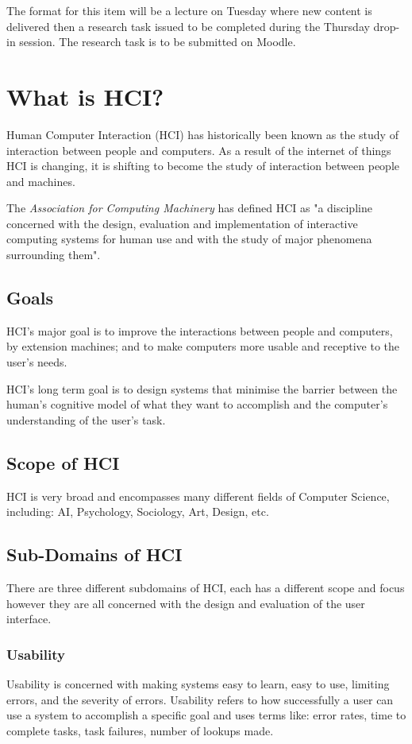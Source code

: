 
The format for this item will be a lecture on Tuesday where new content is delivered then a research task issued to be completed during the Thursday drop-in session. The research task is to be submitted on Moodle.

\section*{What is HCI?}
Human Computer Interaction (HCI) has historically been known as the study of interaction between people and computers. As a result of the internet of things HCI is changing, it is shifting to become the study of interaction between people and machines. 

The \textit{Association for Computing Machinery} has defined HCI as "a discipline concerned with the design, evaluation and implementation of interactive computing systems for human use and with the study of major phenomena surrounding them".

\subsection*{Goals}
HCI's major goal is to improve the interactions between people and computers, by extension machines; and to make computers more usable and receptive to the user's needs.

HCI's long term goal is to design systems that minimise the barrier between the human's cognitive model of what they want to accomplish and the computer's understanding of the user's task. 

\subsection*{Scope of HCI}
HCI is very broad and encompasses many different fields of Computer Science, including: AI, Psychology, Sociology, Art, Design, etc. 

\subsection*{Sub-Domains of HCI}
There are three different subdomains of HCI, each has a different scope and focus however they are all concerned with the design and evaluation of the user interface.
\subsubsection*{Usability}
Usability is concerned with making systems easy to learn, easy to use, limiting errors, and the severity of errors. Usability refers to how successfully a user can use a system to accomplish a specific goal and uses terms like: error rates, time to complete tasks, task failures, number of lookups made.
